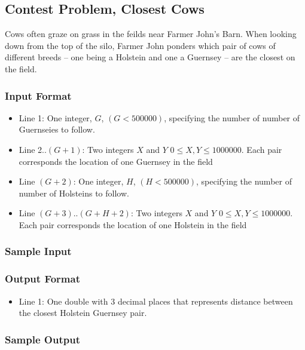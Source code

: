 \subsection{Contest Problem, Closest Cows}
Cows often graze on grass in the feilds near Farmer John's Barn.
When looking down from the top of the silo, Farmer John ponders which pair of cows of different breeds -- one being a Holstein and one a Guernsey -- are the closest on the field.

\subsubsection{Input Format}
\begin{itemize}
	\item Line 1: One integer, $G$, $(G < 500000)$, specifying the number of number of Guernseies to follow.
	\item Line 2..$(G+1)$: Two integers $X$ and $Y$ $0 \leq X,Y \leq 1000000$.
		Each pair corresponds the location of one Guernsey in the field
	\item Line $(G+2)$: One integer, $H$, $(H < 500000)$, specifying the number of number of Holsteins to follow. 
	\item Line $(G+3)$..$(G+H+2)$: Two integers $X$ and $Y$ $0 \leq X,Y \leq 1000000$.
		Each pair corresponds the location of one Holstein in the field
\end{itemize}

\subsubsection{Sample Input}


\subsubsection{Output Format}
\begin{itemize}
  \item Line 1: One double with 3 decimal places that represents distance between the closest Holstein Guernsey pair.
\end{itemize}

\subsubsection{Sample Output}


